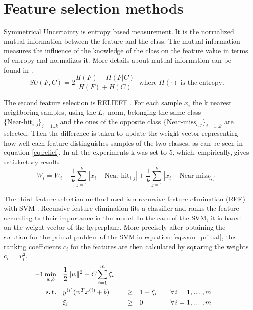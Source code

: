 \documentclass[twoside,11pt]{article}
\begin{document}
\section{Feature selection methods}

Symmetrical Uncertainty \citep{press1996numerical} is entropy based measurement. It is the normalized mutual information between the feature and the class. The mutual information measures the influence of the knowledge of the class on the feature value in terms of entropy and normalizes it. More details about mutual information can be found in \cite{paninski2003estimation}.
\begin{equation}
  \label{eq:su}
  SU(F,C) = 2 \frac{H(F) - H(F|C)}{H(F) + H(C)} \textrm{, where } H(\cdot) \textrm{ is the entropy.}
\end{equation}

The second feature selection is RELIEFF \citep{kononenko1997overcoming}. For each sample $x_i$ the k nearest neighboring samples, using the $L_1$ norm, belonging the same class $\{\textrm{Near-hit}_{i, j}\}_{j=1..k}$ and the ones of the opposite class $\{\textrm{Near-miss}_{i, j}\}_{j=1..k}$ are selected. Then the difference is taken to update the weight vector representing how well each feature distinguishes samples of the two classes, as can be seen in equation \ref{eq:relief}. In all the experiments k was set to 5, which, empirically, gives satisfactory results. 
\begin{equation}
  \label{eq:relief}
  W_i = W_i - \frac{1}{k}\sum_{j=1}^{k}|x_i - \textrm{Near-hit}_{i,j}| + \frac{1}{k}\sum_{j=1}^{k} |x_i - \textrm{Near-miss}_{i,j}|
\end{equation}

The third feature selection method used is a recursive feature elimination (RFE) with SVM \citep{guyon2002gene}. Recursive feature elimination fits a classifier and ranks the feature according to their importance in the model. In the case of the SVM, it is based on the weight vector of the hyperplane. More precisely after obtaining the solution for the primal problem of the SVM in equation \ref{eq:svm_primal}, the ranking coefficients $c_i$ for the features are then calculated by squaring the weights $c_i = w_i^2$.
\begin{alignat}{-1}
     \min_{w,b}  & \quad \frac12\|w\|^2 + C\sum_{i=1}^m \xi_i & & & \label{eq:svm_primal} \\ 
   \text{s.\,t.} & \quad y^{(i)} (w^Tx^{(i)} + b) & \quad \geq & \quad 1 -\xi_i &&
                   \quad \forall \, i = 1, \ldots, m \nonumber \\
                 & \quad \xi_i                  & \quad \geq & \quad 0 &&
                   \quad \forall \, i = 1, \ldots, m \nonumber 
\end{alignat}
\end{document}

